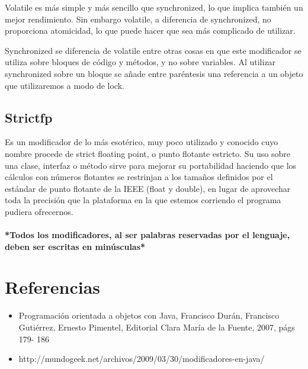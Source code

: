 \documentclass[12pt,letterpaper]{article}
\begin{document}
Volatile es más simple y más sencillo que synchronized, lo que implica también un mejor rendimiento. Sin embargo volatile, a diferencia de synchronized, no proporciona atomicidad, lo que puede hacer que sea más complicado de utilizar.


Synchronized se diferencia de volatile entre otras cosas en que este modificador se utiliza sobre bloques de código y métodos, y no sobre variables. Al utilizar synchronized sobre un bloque se añade entre paréntesis una referencia a un objeto que utilizaremos a modo de lock.




\subsection*{Strictfp}
Es un modificador de lo más esotérico, muy poco utilizado y conocido cuyo nombre procede de strict floating point, o punto flotante estricto.
Su uso sobre una clase, interfaz o método sirve para mejorar su portabilidad haciendo que los cálculos con números flotantes se restrinjan a los tamaños definidos por el estándar de punto flotante de la IEEE (float y double), en lugar de aprovechar toda la precisión que la plataforma en la que estemos corriendo el programa pudiera ofrecernos.

\paragraph{*Todos los modificadores, al ser palabras reservadas por el lenguaje, deben ser escritas en minúsculas*}

\section{Referencias}

\begin{itemize}
\item Programación orientada a objetos con Java, Francisco Durán, Francisco Gutiérrez, Ernesto Pimentel, Editorial Clara María de la Fuente, 2007, págs 179- 186  
\item http://mundogeek.net/archivos/2009/03/30/modificadores-en-java/


\end{itemize}
\end{document}
